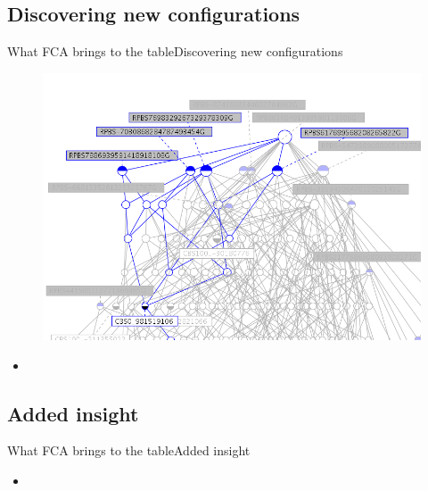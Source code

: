 \subsection{Discovering new configurations}
\begin{frame}{What FCA brings to the table}{Discovering new
    configurations}

\begin{minipage}[t]{0.40\linewidth}
  \begin{figure}[ht]
    \centering
    \includegraphics[width=\textwidth]{img/fca/common_part}
  \end{figure}
\end{minipage}
\begin{minipage}{0.60\linewidth}
  \begin{itemize}
    \item 
  \end{itemize}
\end{minipage}

\end{frame}


\subsection{Added insight}
\begin{frame}{What FCA brings to the table}{Added insight}

\begin{minipage}[t]{0.40\linewidth}
  \begin{figure}[ht]
    \centering
  \end{figure}
\end{minipage}
\begin{minipage}{0.60\linewidth}
  \begin{itemize}
    \item 
  \end{itemize}
\end{minipage}

\end{frame}
